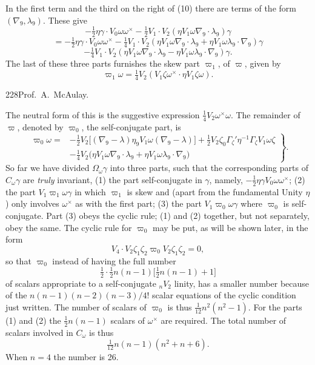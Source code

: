 \documentclass[11pt]{article}
\begin{document}
\indent In the first term and the third on the right of (10) there are terms of the form $(\nabla_9,\lambda_9)$. These give
\[
-\tfrac12\eta\gamma\mathbin{\cdot}V_0\omega\omega^\times-\tfrac12V_1\mathbin{\cdot}V_2(\eta V_1\omega\nabla_9\mathbin{\cdot}\lambda_9)\gamma
\]
\[
=-\tfrac12\eta\gamma\mathbin{\cdot}V_0\omega\omega^\times-\tfrac14V_1\mathbin{\cdot}V_2(\eta V_1\omega\nabla_9\mathbin{\cdot}\lambda_9+\eta V_1\omega\lambda_9\mathbin{\cdot}\nabla_9)\gamma
\]
\[
-\tfrac14V_1\mathbin{\cdot}V_2(\eta V_1\omega\nabla_9\mathbin{\cdot}\lambda_9-\eta V_1\omega\lambda_9\mathbin{\cdot}\nabla_9)\gamma.
\]
The last of these three parts furnishes the skew part $\varpi_1$, of $\varpi$, given by
\begin{equation}\varpi_1\omega=\tfrac14V_2(V_1\zeta\omega^\times\mathbin{\cdot}\eta V_1\zeta\omega).\tag{11}\end{equation}
\newpage\thispagestyle{empty}\begin{center}228\hfill Prof.\ A.\ McAulay.\end{center}
The neutral form of this is the suggestive expression $\tfrac14V_2\omega^\times\omega$. The remainder of $\varpi$, denoted by $\varpi_0$, the self-conjugate part, is
\begin{equation}
\left.\begin{aligned}
\varpi_0\omega={}&-\tfrac12V_2\bigl[(\nabla_9-\lambda)\eta_9V_1\omega(\nabla_9-\lambda)\bigr]+\tfrac12V_2\zeta_0\Gamma_\zeta'\eta^{-1}\Gamma_\zeta V_1\omega\zeta\\
&-\tfrac14V_2\bigl(\eta V_1\omega\nabla_9\mathbin{\cdot}\lambda_9+\eta V_1\omega\lambda_9\mathbin{\cdot}\nabla_9\bigr)
\end{aligned}\right\}.\tag{12}
\end{equation}
So far we have divided $\Omega_\omega\gamma$ into three parts, such that the corresponding parts of $C_\omega\gamma$ are \emph{truly} invariant, (1) the part self-conjugate in $\gamma$, namely, $-\tfrac12\eta\gamma V_0\omega\omega^\times$; (2) the part $V_1\varpi_1\omega\gamma$ in which $\varpi_1$ is skew and (apart from the fundamental Unity $\eta$) only involves $\omega^\times$ as with the first part; (3) the part $V_1\varpi_0\omega\gamma$ where $\varpi_0$ is self-conjugate. Part (3) obeys the cyclic rule; (1) and (2) together, but not separately, obey the same. The cyclic rule for $\varpi_0$ may be put, as will be shown later, in the form
\[
V_4\mathbin{\cdot}V_2\zeta_1\zeta_2\varpi_0V_2\zeta_1\zeta_2=0,
\]
so that $\varpi_0$ instead of having the full number
\[
\tfrac12\mathbin{\cdot}\tfrac12n(n-1)\bigl[\tfrac12n(n-1)+1\bigr]
\]
of scalars appropriate to a self-conjugate ${}_nV_2$ linity, has a smaller number because of the $n(n-1)(n-2)(n-3)/4!$ scalar equations of the cyclic condition just written. The number of scalars of $\varpi_0$ is thus $\tfrac1{12}n^2(n^2-1)$. For the parts (1) and (2) the $\tfrac12n(n-1)$ scalars of $\omega^\times$ are required. The total number of scalars involved in $C_\omega$ is thus
\[
\tfrac1{12}n(n-1)(n^2+n+6).
\]
When $n=4$ the number is 26.
\end{document}
